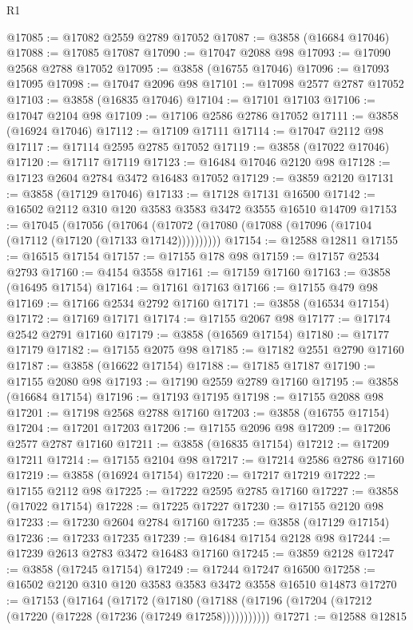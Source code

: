 \begin{lexlean}{R1}
\begin{coremodule}
@17085 := @17082 @2559 @2789 @17052
@17087 := @3858 (@16684 @17046)
@17088 := @17085 @17087
@17090 := @17047 @2088 @98
@17093 := @17090 @2568 @2788 @17052
@17095 := @3858 (@16755 @17046)
@17096 := @17093 @17095
@17098 := @17047 @2096 @98
@17101 := @17098 @2577 @2787 @17052
@17103 := @3858 (@16835 @17046)
@17104 := @17101 @17103
@17106 := @17047 @2104 @98
@17109 := @17106 @2586 @2786 @17052
@17111 := @3858 (@16924 @17046)
@17112 := @17109 @17111
@17114 := @17047 @2112 @98
@17117 := @17114 @2595 @2785 @17052
@17119 := @3858 (@17022 @17046)
@17120 := @17117 @17119
@17123 := @16484 @17046 @2120 @98
@17128 := @17123 @2604 @2784 @3472 @16483 @17052
@17129 := @3859 @2120
@17131 := @3858 (@17129 @17046)
@17133 := @17128 @17131 @16500
@17142 := @16502 @2112 @310 @120 @3583 @3583 @3472 @3555 @16510 @14709
@17153 := @17045
    (@17056 (@17064 (@17072 (@17080 (@17088 (@17096 (@17104 (@17112 (@17120 (@17133 @17142))))))))))
@17154 := @12588 @12811
@17155 := @16515 @17154
@17157 := @17155 @178 @98
@17159 := @17157 @2534 @2793
@17160 := @4154 @3558
@17161 := @17159 @17160
@17163 := @3858 (@16495 @17154)
@17164 := @17161 @17163
@17166 := @17155 @479 @98
@17169 := @17166 @2534 @2792 @17160
@17171 := @3858 (@16534 @17154)
@17172 := @17169 @17171
@17174 := @17155 @2067 @98
@17177 := @17174 @2542 @2791 @17160
@17179 := @3858 (@16569 @17154)
@17180 := @17177 @17179
@17182 := @17155 @2075 @98
@17185 := @17182 @2551 @2790 @17160
@17187 := @3858 (@16622 @17154)
@17188 := @17185 @17187
@17190 := @17155 @2080 @98
@17193 := @17190 @2559 @2789 @17160
@17195 := @3858 (@16684 @17154)
@17196 := @17193 @17195
@17198 := @17155 @2088 @98
@17201 := @17198 @2568 @2788 @17160
@17203 := @3858 (@16755 @17154)
@17204 := @17201 @17203
@17206 := @17155 @2096 @98
@17209 := @17206 @2577 @2787 @17160
@17211 := @3858 (@16835 @17154)
@17212 := @17209 @17211
@17214 := @17155 @2104 @98
@17217 := @17214 @2586 @2786 @17160
@17219 := @3858 (@16924 @17154)
@17220 := @17217 @17219
@17222 := @17155 @2112 @98
@17225 := @17222 @2595 @2785 @17160
@17227 := @3858 (@17022 @17154)
@17228 := @17225 @17227
@17230 := @17155 @2120 @98
@17233 := @17230 @2604 @2784 @17160
@17235 := @3858 (@17129 @17154)
@17236 := @17233 @17235
@17239 := @16484 @17154 @2128 @98
@17244 := @17239 @2613 @2783 @3472 @16483 @17160
@17245 := @3859 @2128
@17247 := @3858 (@17245 @17154)
@17249 := @17244 @17247 @16500
@17258 := @16502 @2120 @310 @120 @3583 @3583 @3472 @3558 @16510 @14873
@17270 := @17153
    (@17164
      (@17172
        (@17180 (@17188 (@17196 (@17204 (@17212 (@17220 (@17228 (@17236 (@17249 @17258)))))))))))
@17271 := @12588 @12815

\end{coremodule}
\end{lexlean}
